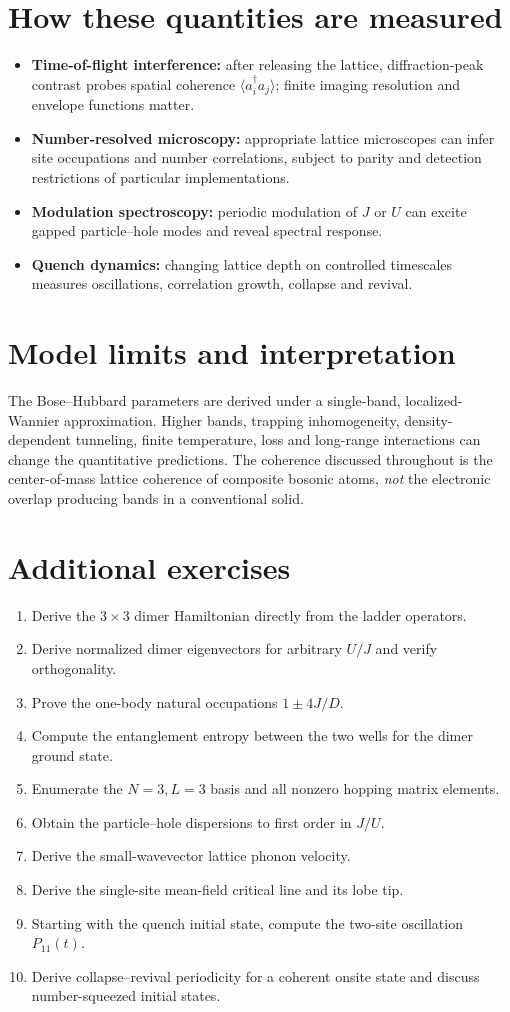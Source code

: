 \documentclass[11pt,a4paper]{article}
\begin{document}
\section{How these quantities are measured}
\begin{itemize}
\item \textbf{Time-of-flight interference:} after releasing the lattice, diffraction-peak contrast probes spatial coherence $\langle a_i^\dagger a_j\rangle$; finite imaging resolution and envelope functions matter.
\item \textbf{Number-resolved microscopy:} appropriate lattice microscopes can infer site occupations and number correlations, subject to parity and detection restrictions of particular implementations.
\item \textbf{Modulation spectroscopy:} periodic modulation of $J$ or $U$ can excite gapped particle--hole modes and reveal spectral response.
\item \textbf{Quench dynamics:} changing lattice depth on controlled timescales measures oscillations, correlation growth, collapse and revival.
\end{itemize}
\section{Model limits and interpretation}
The Bose--Hubbard parameters are derived under a single-band, localized-Wannier approximation. Higher bands, trapping inhomogeneity, density-dependent tunneling, finite temperature, loss and long-range interactions can change the quantitative predictions. The coherence discussed throughout is the center-of-mass lattice coherence of composite bosonic atoms, \emph{not} the electronic overlap producing bands in a conventional solid.
\section{Additional exercises}
\begin{enumerate}
\item Derive the $3\times3$ dimer Hamiltonian directly from the ladder operators.
\item Derive normalized dimer eigenvectors for arbitrary $U/J$ and verify orthogonality.
\item Prove the one-body natural occupations $1\pm4J/D$.
\item Compute the entanglement entropy between the two wells for the dimer ground state.
\item Enumerate the $N=3,L=3$ basis and all nonzero hopping matrix elements.
\item Obtain the particle--hole dispersions to first order in $J/U$.
\item Derive the small-wavevector lattice phonon velocity.
\item Derive the single-site mean-field critical line and its lobe tip.
\item Starting with the quench initial state, compute the two-site oscillation $P_{11}(t)$.
\item Derive collapse--revival periodicity for a coherent onsite state and discuss number-squeezed initial states.
\end{enumerate}
\end{document}
